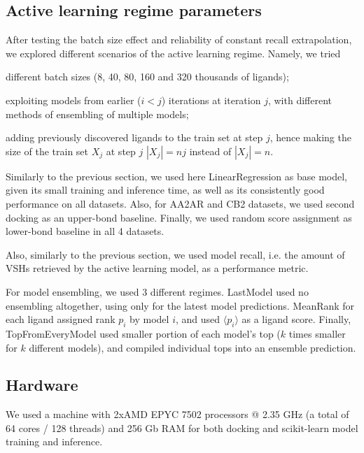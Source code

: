 \subsection{Active learning regime parameters}

After testing the batch size effect and reliability of constant recall extrapolation, we explored different scenarios of the active learning regime. Namely, we tried
\begin{enumerate*}[label=(\roman*)]
    \item different batch sizes (8, 40, 80, 160 and 320 thousands of ligands);
    \item exploiting models from earlier ($i < j$) iterations at iteration $j$, with different methods of ensembling of multiple models;
    \item adding previously discovered ligands to the train set at step $j$, hence making the size of the train set $X_j$ at step $j$ $|X_j| = nj$ instead of $|X_j|=n$.
\end{enumerate*}

Similarly to the previous section, we used here LinearRegression as base model, given its small training and inference time, as well as its consistently good performance on all datasets. Also, for AA2AR and CB2 datasets, we used second docking as an upper-bond baseline. Finally, we used random score assignment as lower-bond baseline in all 4 datasets. 

Also, similarly to the previous section, we used model recall, i.e. the amount of VSHs retrieved by the active learning model, as a performance metric.

For model ensembling, we used 3 different regimes. LastModel used no ensembling altogether, using only for the latest model predictions. MeanRank for each ligand assigned rank $p_i$ by model $i$, and used $\langle p_i \rangle$ as a ligand score. Finally, TopFromEveryModel used smaller portion of each model's top ($k$ times smaller for $k$ different models), and compiled individual tops into an ensemble prediction.


\subsection{Hardware}
We used a machine with 2xAMD EPYC 7502 processors @ 2.35 GHz (a total of 64 cores / 128 threads) and 256 Gb RAM for both docking and scikit-learn model training and inference.